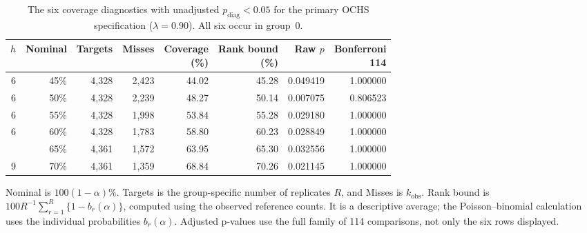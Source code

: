 \begin{table}[!htbp]
\centering
\caption{The six coverage diagnostics with unadjusted
$p_{\mathrm{diag}}<0.05$ for the primary OCHS specification
($\lambda=0.90$). All six occur in group~0.}
\label{tab:coverage-diagnostic-levels}
\begingroup
\small
\setlength{\tabcolsep}{4pt}
\renewcommand{\arraystretch}{1.08}
\begin{tabular}{@{}rrrrrrrr@{}}
\toprule
$h$ & Nominal & Targets & Misses
& \shortstack{Coverage\\(\%)}
& \shortstack{Rank bound\\(\%)}
& Raw $p$ & \shortstack{Bonferroni\\114} \\
\midrule
6 & 45\% & 4,328 & 2,423 & 44.02 & 45.28 & 0.049419 & 1.000000 \\
6 & 50\% & 4,328 & 2,239 & 48.27 & 50.14 & 0.007075 & 0.806523 \\
6 & 55\% & 4,328 & 1,998 & 53.84 & 55.28 & 0.029180 & 1.000000 \\
6 & 60\% & 4,328 & 1,783 & 58.80 & 60.23 & 0.028849 & 1.000000 \\
\addlinespace[3pt]
9 & 65\% & 4,361 & 1,572 & 63.95 & 65.30 & 0.032556 & 1.000000 \\
9 & 70\% & 4,361 & 1,359 & 68.84 & 70.26 & 0.021145 & 1.000000 \\
\bottomrule
\end{tabular}
\par\vspace{5pt}
\begin{minipage}{0.97\linewidth}
\footnotesize
Nominal is $100(1-\alpha)\%$. Targets is the group-specific number
of replicates $R$, and Misses is $k_{\mathrm{obs}}$.
Rank bound is $100R^{-1}\sum_{r=1}^{R}\{1-b_r(\alpha)\}$,
computed using the observed reference counts. It is a descriptive
average; the Poisson--binomial calculation uses the individual
probabilities $b_r(\alpha)$. Adjusted p-values use the full family
of 114 comparisons, not only the six rows displayed.
\end{minipage}
\endgroup
\end{table}
